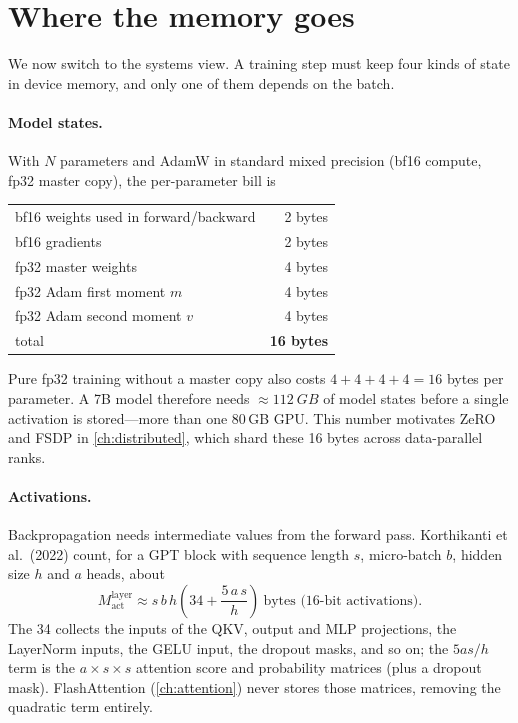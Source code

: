\section{Where the memory goes}\label{sec:pretrain:memory}

We now switch to the systems view. A training step must keep four kinds of state in device
memory, and only one of them depends on the batch.

\paragraph{Model states.} With $N$ parameters and AdamW in standard mixed precision (bf16 compute,
fp32 master copy), the per-parameter bill is
\begin{center}
\begin{tabular}{lr}
bf16 weights used in forward/backward & 2 bytes \\
bf16 gradients & 2 bytes \\
fp32 master weights & 4 bytes \\
fp32 Adam first moment $m$ & 4 bytes \\
fp32 Adam second moment $v$ & 4 bytes \\
\midrule
total & \textbf{16 bytes}
\end{tabular}
\end{center}
Pure fp32 training without a master copy also costs $4+4+4+4=16$ bytes per parameter. A 7B
model therefore needs $\approx\SI{112}{GB}$ of model states before a single activation is
stored---more than one 80\,GB GPU. This number motivates ZeRO and FSDP in
\cref{ch:distributed}, which shard these 16 bytes across data-parallel ranks.

\paragraph{Activations.} Backpropagation needs intermediate values from the forward pass.
Korthikanti et al.\ (2022) count, for a GPT block with sequence length $s$, micro-batch $b$,
hidden size $h$ and $a$ heads, about
\begin{equation}
M_{\text{act}}^{\text{layer}} \approx s\,b\,h\left(34 + \frac{5\,a\,s}{h}\right)\ \text{bytes (16-bit activations)}.
\label{eq:pretrain:act}
\end{equation}
The 34 collects the inputs of the QKV, output and MLP projections, the LayerNorm inputs, the
GELU input, the dropout masks, and so on; the $5as/h$ term is the $a\times s\times s$ attention
score and probability matrices (plus a dropout mask). FlashAttention (\cref{ch:attention})
never stores those matrices, removing the quadratic term entirely.

